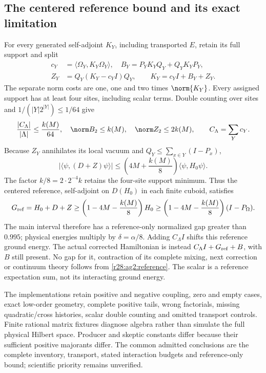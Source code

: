 \subsection{The centered reference bound and its exact limitation}
For every generated self-adjoint $K_Y$, including transported $E$, retain its full support and split
\begin{align}
c_Y&=\langle\Omega_Y,K_Y\Omega_Y\rangle,\quad
B_Y=P_YK_YQ_Y+Q_YK_YP_Y,\nonumber\\
Z_Y&=Q_Y(K_Y-c_YI)Q_Y,\qquad K_Y=c_YI+B_Y+Z_Y.
\label{r28:ag2:split}
\end{align}
The separate norm costs are one, one and two times $\norm{K_Y}$. Every assigned support has at least four sites, including scalar terms. Double counting over sites and $1/(|Y|2^{|Y|})\le1/64$ give
\begin{equation}
\frac{|C_\Lambda|}{|\Lambda|}\le\frac{k(M)}{64},\quad
\norm B_2\le k(M),\quad \norm Z_2\le2k(M),\qquad C_\Lambda=\sum_Yc_Y.
\label{r28:ag2:density}
\end{equation}
Because $Z_Y$ annihilates its local vacuum and $Q_Y\le\sum_{x\in Y}(I-P_x)$,
\begin{equation}
|\langle\psi,(D+Z)\psi\rangle|
\le\left(4M+\frac{k(M)}8\right)\langle\psi,H_0\psi\rangle.
\label{r28:ag2:form}
\end{equation}
The factor $k/8=2\cdot2^{-4}k$ retains the four-site support minimum. Thus the centered reference, self-adjoint on $D(H_0)$ in each finite cuboid, satisfies
\begin{equation}
G_{\rm ref}=H_0+D+Z\ge
\left(1-4M-\frac{k(M)}8\right)H_0
\ge\left(1-4M-\frac{k(M)}8\right)(I-P_\Omega).
\label{r28:ag2:reference}
\end{equation}
The main interval therefore has a reference-only normalized gap greater than $0.995$; physical energies multiply by $\delta=\alpha/8$. Adding $C_\Lambda I$ shifts this reference ground energy. The actual corrected Hamiltonian is instead $C_\Lambda I+G_{\rm ref}+B$, with $B$ still present. No gap for it, contraction of its complete mixing, next correction or continuum theory follows from \eqref{r28:ag2:reference}. The scalar is a reference expectation sum, not its interacting ground energy.

The implementations retain positive and negative coupling, zero and empty cases, exact low-order geometry, complete positive tails, wrong factorials, missing quadratic/cross histories, scalar double counting and omitted transport controls. Finite rational matrix fixtures diagnose algebra rather than simulate the full physical Hilbert space. Producer and skeptic constants differ because their sufficient positive majorants differ. The common admitted conclusions are the complete inventory, transport, stated interaction budgets and reference-only bound; scientific priority remains unverified.
